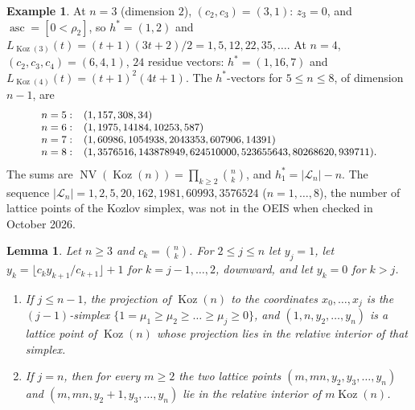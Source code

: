 \documentclass[11pt, a4paper, abstract=yes]{scrartcl}
\theoremstyle{definition}
\newtheorem{mexample}[definition]{Example}
\theoremstyle{remark}
\theoremstyle{plain}
\newtheorem{lemma}[definition]{Lemma}
\theoremstyle{remark}
\theoremstyle{plain}
\newcommand{\Koz}{\operatorname{Koz}}
\newcommand{\NV}{\operatorname{NV}}
\newcommand{\asc}{\operatorname{asc}}
\newcommand{\leannone}{\tikz[baseline=-0.6ex]\draw[leannone,line width=0.6pt] (0,0) circle (0.55ex);}
\newcommand{\leanmark}[1]{\leavevmode{\reversemarginpar\marginnote{\raggedleft#1}}}
\begin{document}
\begin{mexample}
At \(n=3\) (dimension \(2\)), \((c_2,c_3)=(3,1)\): \(z_3=0\), and \(\asc=[0<\rho_2]\), so \(h^*=(1,2)\) and
\(L_{\Koz(3)}(t)=(t+1)(3t+2)/2=1,5,12,22,35,\dots\). At \(n=4\), \((c_2,c_3,c_4)=(6,4,1)\), \(24\) residue vectors:
\(h^*=(1,16,7)\) and \(L_{\Koz(4)}(t)=(t+1)^2(4t+1)\). The \(h^*\)-vectors for \(5\le n\le8\), of dimension \(n-1\), are
\[\small
\begin{array}{ll}
n=5: & (1,157,308,34)\\
n=6: & (1,1975,14184,10253,587)\\
n=7: & (1,60986,1054938,2043353,607906,14391)\\
n=8: & (1,3576516,143878949,624510000,523655643,80268620,939711).
\end{array}
\]
The sums are \(\NV(\Koz(n))=\prod_{k\ge2}\binom nk\), and \(h^*_1=\lvert\mathcal L_n\rvert-n\). The
sequence \(\lvert\mathcal L_n\rvert=1,2,5,20,162,1981,60993,3576524\) (\(n=1,\dots,8\)), the number of
lattice points of the Kozlov simplex, was not in the OEIS \autocite{OEIS} when checked in October 2026.
\label{ex-hstar}
\end{mexample}

\begin{lemma}
\leanmark{\leannone}Let \(n\ge3\) and \(c_k=\binom nk\). For \(2\le j\le n\) let \(y_j=1\), let
\(y_k=\lfloor c_ky_{k+1}/c_{k+1}\rfloor+1\) for \(k=j-1,\dots,2\), downward, and let \(y_k=0\) for
\(k>j\).
\begin{enumerate}
\item If \(j\le n-1\), the projection of \(\Koz(n)\) to the coordinates \(x_0,\dots,x_j\) is the
\((j-1)\)-simplex \(\lbrace1=\mu_1\ge\mu_2\ge\dots\ge\mu_j\ge0\rbrace\), and
\((1,n,y_2,\dots,y_n)\) is a lattice point of \(\Koz(n)\) whose projection lies in the relative
interior of that simplex.
\item If \(j=n\), then for every \(m\ge2\) the two lattice points \((m,mn,y_2,y_3,\dots,y_n)\) and
\((m,mn,y_2+1,y_3,\dots,y_n)\) lie in the relative interior of \(m\Koz(n)\).
\end{enumerate}
\label{lem-interior-points}
\end{lemma}
\end{document}
